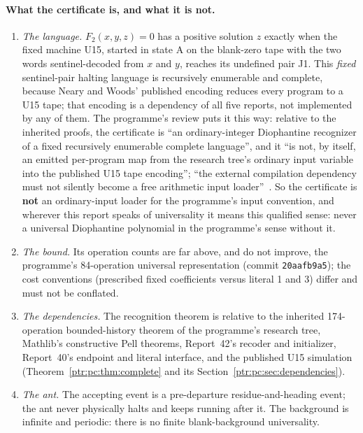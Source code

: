 \documentclass[11pt,letterpaper]{article}
\theoremstyle{definition}\newtheorem{definition}[theorem]{Definition}
\theoremstyle{remark}\newtheorem{remark}[theorem]{Remark}
\begin{document}
\paragraph{What the certificate is, and what it is not.}
\begin{enumerate}[label=(\alph*)]
\item\label{ptr:it:scope} \emph{The language.} $F_2(x,y,z)=0$ has a positive
solution $z$ exactly when the fixed machine U15, started in state A on the
blank-zero tape with the two words sentinel-decoded from $x$ and $y$, reaches
its undefined pair J1. This \emph{fixed} sentinel-pair halting language is
recursively enumerable and complete, because Neary and Woods' published
encoding reduces every program to a U15 tape; that encoding is a dependency
of all five reports, not implemented by any of them. The programme's review
puts it this way: relative to the inherited proofs, the certificate is ``an
ordinary-integer Diophantine recognizer of a fixed recursively enumerable
complete language'', and it ``is not, by itself, an emitted per-program map
from the research tree's ordinary input variable into the published U15
tape encoding''; ``the external compilation dependency must not silently
become a free arithmetic input loader''~\cite{ptr:w:rev4048}. So the
certificate is \textbf{not} an ordinary-input loader for the programme's
input convention, and wherever this report speaks of universality it means
this qualified sense: never a universal Diophantine polynomial in the
programme's sense without it.
\item \emph{The bound.} Its operation counts are far above, and do not
improve, the programme's 84-operation universal representation (commit
\texttt{20aafb9a5}); the cost conventions (prescribed fixed coefficients
versus literal 1 and 3) differ and must not be conflated.
\item \emph{The dependencies.} The recognition theorem is relative to the
inherited 174-operation bounded-history theorem of the programme's research
tree, Mathlib's constructive Pell theorems, Report~42's recoder and
initializer, Report~40's endpoint and literal interface, and the published
U15 simulation (Theorem~\ref{ptr:pc:thm:complete} and its Section~\ref{ptr:pc:sec:dependencies}).
\item \emph{The ant.} The accepting event is a pre-departure residue-and-heading
event; the ant never physically halts and keeps running after it. The
background is infinite and periodic: there is no finite blank-background
universality.
\end{enumerate}
\end{document}
